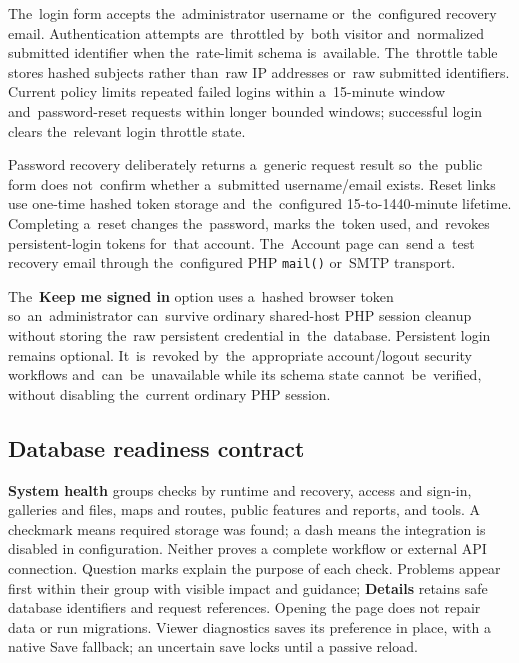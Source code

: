 \documentclass[11pt,a4paper]{article}
\newcommand{\ui}[1]{\textbf{#1}}
\newcommand{\codeword}[1]{\nolinkurl{#1}}
\begin{document}
The~login form accepts the~administrator username or~the~configured recovery
email. Authentication attempts are~throttled by~both visitor and~normalized
submitted identifier when the~rate-limit schema is~available. The~throttle table
stores hashed subjects rather than~raw IP addresses or~raw submitted
identifiers. Current policy limits repeated failed logins within a~15-minute
window and~password-reset requests within longer bounded windows; successful
login clears the~relevant login throttle state.

Password recovery deliberately returns a~generic request result so~the~public
form does not~confirm whether a~submitted username/email exists. Reset links use
one-time hashed token storage and~the~configured 15-to-1440-minute lifetime.
Completing a~reset changes the~password, marks the~token used, and~revokes
persistent-login tokens for~that account. The~Account page can~send a~test
recovery email through the~configured PHP \codeword{mail()} or~SMTP transport.

The~\ui{Keep me signed in} option uses a~hashed browser token
so~an~administrator can~survive ordinary shared-host PHP session cleanup without
storing the~raw persistent credential in~the~database. Persistent login remains
optional. It~is~revoked by~the~appropriate account/logout security workflows
and~can~be~unavailable while its schema state cannot~be~verified, without
disabling the~current ordinary PHP session.

\subsection{Database readiness contract}
\label{sec:db-readiness-contract}

\ui{System health} groups checks by runtime and recovery, access and sign-in,
galleries and files, maps and routes, public features and reports, and tools.
A checkmark means required storage was found; a dash means the integration is
disabled in configuration. Neither proves a complete workflow or external API
connection. Question marks explain the purpose of each check. Problems appear
first within their group with visible impact and guidance; \ui{Details} retains
safe database identifiers and request references. Opening the page does not
repair data or run migrations. Viewer diagnostics saves its preference in place,
with a native Save fallback; an uncertain save locks until a passive reload.
\end{document}
